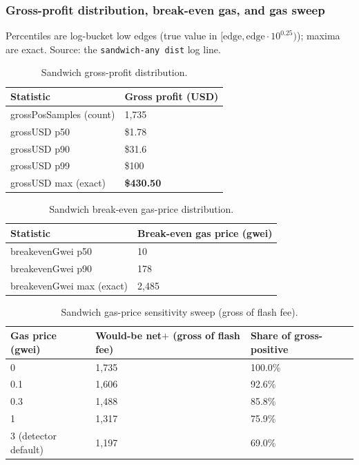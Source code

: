 \documentclass[11pt]{article}
\newcommand{\code}[1]{\texttt{#1}}
\begin{document}
\subsubsection{Gross-profit distribution, break-even gas, and gas sweep}
Percentiles are log-bucket low edges (true value in $[\text{edge},\text{edge}\cdot
10^{0.25})$); maxima are exact. Source: the \code{sandwich-any dist} log line.
\begin{table}[h]\centering
\caption{Sandwich gross-profit distribution.}\label{tab:swgross}
\begin{tabular}{ll}
\toprule
Statistic & Gross profit (USD) \\
\midrule
grossPosSamples (count) & 1{,}735 \\
grossUSD p50 & \$1.78 \\
grossUSD p90 & \$31.6 \\
grossUSD p99 & \$100 \\
grossUSD max (exact) & \textbf{\$430.50} \\
\bottomrule
\end{tabular}
\end{table}

\begin{table}[h]\centering
\caption{Sandwich break-even gas-price distribution.}\label{tab:swbreak}
\begin{tabular}{ll}
\toprule
Statistic & Break-even gas price (gwei) \\
\midrule
breakevenGwei p50 & 10 \\
breakevenGwei p90 & 178 \\
breakevenGwei max (exact) & 2{,}485 \\
\bottomrule
\end{tabular}
\end{table}

\begin{table}[h]\centering
\caption{Sandwich gas-price sensitivity sweep (gross of flash fee).}\label{tab:swsweep}
\begin{tabular}{lll}
\toprule
Gas price (gwei) & Would-be net$+$ (gross of flash fee) & Share of gross-positive \\
\midrule
0 & 1{,}735 & 100.0\% \\
0.1 & 1{,}606 & 92.6\% \\
0.3 & 1{,}488 & 85.8\% \\
1 & 1{,}317 & 75.9\% \\
3 (detector default) & 1{,}197 & 69.0\% \\
\bottomrule
\end{tabular}
\end{table}
\end{document}
